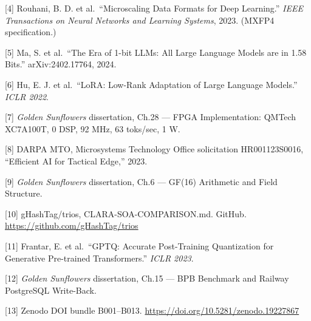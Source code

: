 [4] Rouhani, B. D. et al.~``Microscaling Data
Formats for Deep Learning.'' \emph{IEEE
Transactions on Neural Networks and Learning
Systems}, 2023. (MXFP4 specification.)

[5] Ma, S. et al.~``The Era of 1-bit LLMs: All
Large Language Models are in 1.58 Bits.''
arXiv:2402.17764, 2024.

[6] Hu, E. J. et al.~``LoRA: Low-Rank
Adaptation of Large Language Models.'' \emph{ICLR
2022}.

[7] \emph{Golden Sunflowers} dissertation,
Ch.28 --- FPGA Implementation: QMTech XC7A100T, 0
DSP, 92 MHz, 63 toks/sec, 1 W.

[8] DARPA MTO, Microsystems Technology Office
solicitation HR001123S0016, ``Efficient AI for
Tactical Edge,'' 2023.

[9] \emph{Golden Sunflowers} dissertation,
Ch.6 --- GF(16) Arithmetic and Field Structure.

[10] gHashTag/trios, CLARA-SOA-COMPARISON.md.
GitHub. \url{https://github.com/gHashTag/trios}

[11] Frantar, E. et al.~``GPTQ: Accurate
Post-Training Quantization for Generative
Pre-trained Transformers.'' \emph{ICLR 2023}.

[12] \emph{Golden Sunflowers} dissertation,
Ch.15 --- BPB Benchmark and Railway PostgreSQL Write-Back.

[13] Zenodo DOI bundle B001--B013.
\url{https://doi.org/10.5281/zenodo.19227867}

